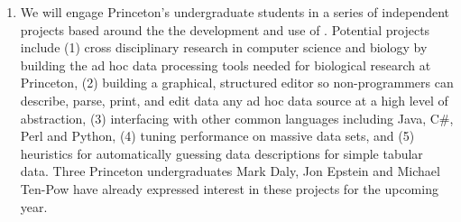 \documentclass[11pt]{article}
\begin{document}
\begin{enumerate}

\item We will engage Princeton's undergraduate students in 
a series of independent projects based around the the development and use of
\datatype.  Potential projects include (1) cross disciplinary
research in computer science and biology by building the ad hoc
data processing tools needed for biological research at 
Princeton, (2) building a graphical, structured editor 
so non-programmers can
describe, parse, print, and edit data any ad hoc data source
at a high level of abstraction,
(3) interfacing \datatype{} with other common languages including
Java, C\#, Perl and Python,
(4) tuning performance on massive data sets, and
(5) heuristics for automatically guessing data 
descriptions for simple tabular data.  Three
Princeton undergraduates Mark Daly, Jon Epstein and Michael Ten-Pow
have already expressed interest in these projects for the upcoming year.
\end{enumerate}


\end{document}
